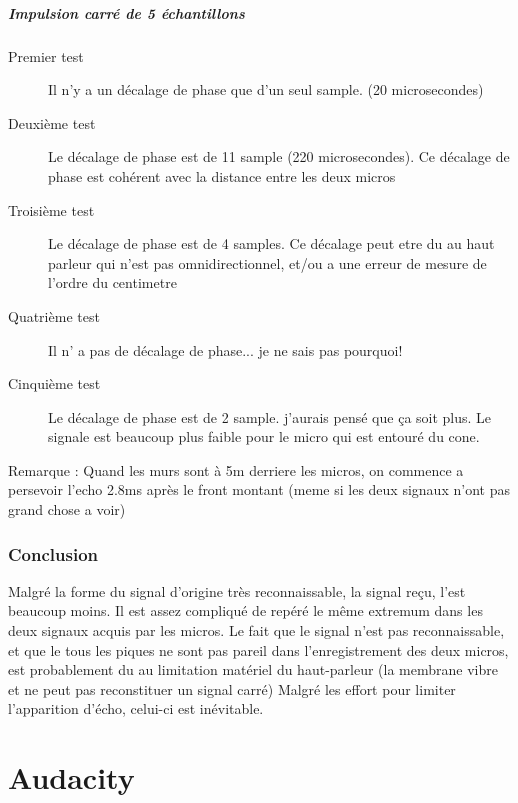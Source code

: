 \documentclass[12pt,a4paper]{report}
\begin{document}
\paragraph{Impulsion carré de 5 échantillons}
\begin{description}
\item[Premier test] Il n'y a un décalage de phase que d'un seul sample. (20 microsecondes)
\item[Deuxième test] Le décalage de phase est de 11 sample (220 microsecondes). Ce décalage de phase est cohérent avec la distance entre les deux micros
\item[Troisième test] Le décalage de phase est de 4 samples.  Ce décalage peut etre du au haut parleur qui n'est pas omnidirectionnel, et/ou a une erreur de mesure de l'ordre du centimetre
\item[Quatrième test] Il n' a pas de décalage de phase... je ne sais pas pourquoi!
\item[Cinquième test] Le décalage de phase est de 2 sample. j'aurais pensé que ça soit plus. Le signale est beaucoup plus faible pour le micro qui est entouré du cone. 
\end{description}
\begin{huge}
Remarque : Quand les murs sont à 5m derriere les micros, on commence a persevoir l'echo 2.8ms après le front montant (meme si les deux signaux n'ont pas grand chose a voir)
\end{huge}

\subsection{Conclusion}
	Malgré la forme du signal d'origine très reconnaissable, la signal reçu, l'est beaucoup moins. Il est assez compliqué de repéré le même extremum dans les deux signaux acquis par les micros.
	Le fait que le signal n'est pas reconnaissable, et que le tous les piques ne sont pas pareil dans l'enregistrement des deux micros, est probablement du au limitation matériel du haut-parleur (la membrane vibre et ne peut pas reconstituer un signal carré)
	Malgré les effort pour limiter l'apparition d'écho, celui-ci est inévitable.
	
	
\appendix
\chapter{Audacity}
\end{document}

